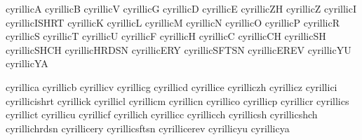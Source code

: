 
\startencoding[uc]

 cyrillicA     {}
 cyrillicB     {}
 cyrillicV     {}
 cyrillicG     {}
 cyrillicD     {}
 cyrillicE     {}
 cyrillicZH    {}
 cyrillicZ     {}
 cyrillicI     {}
 cyrillicISHRT {}
 cyrillicK     {}
 cyrillicL     {}
 cyrillicM     {}
 cyrillicN     {}
 cyrillicO     {}
 cyrillicP     {}
 cyrillicR     {}
 cyrillicS     {}
 cyrillicT     {}
 cyrillicU     {}
 cyrillicF     {}
 cyrillicH     {}
 cyrillicC     {}
 cyrillicCH    {}
 cyrillicSH    {}
 cyrillicSHCH  {}
 cyrillicHRDSN {}
 cyrillicERY   {}
 cyrillicSFTSN {}
 cyrillicEREV  {}
 cyrillicYU    {}
 cyrillicYA    {}

 cyrillica     {}
 cyrillicb     {}
 cyrillicv     {}
 cyrillicg     {}
 cyrillicd     {}
 cyrillice     {}
 cyrilliczh    {}
 cyrillicz     {}
 cyrillici     {}
 cyrillicishrt {}
 cyrillick     {}
 cyrillicl     {}
 cyrillicm     {}
 cyrillicn     {}
 cyrillico     {}
 cyrillicp     {}
 cyrillicr     {}
 cyrillics     {}
 cyrillict     {}
 cyrillicu     {}
 cyrillicf     {}
 cyrillich     {}
 cyrillicc     {}
 cyrillicch    {}
 cyrillicsh    {}
 cyrillicshch  {}
 cyrillichrdsn {}
 cyrillicery   {}
 cyrillicsftsn {}
 cyrillicerev  {}
 cyrillicyu    {}
 cyrillicya    {}

